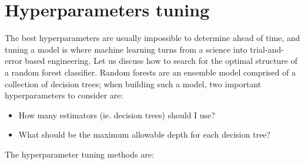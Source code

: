 \documentclass{book}
\begin{document}
\section{Hyperparameters tuning}
The best hyperparameters are usually impossible to determine ahead of time, and tuning a model is where machine learning turns from a science into trial-and-error based engineering.
Let us discuss how to search for the optimal structure of a random forest classifier. Random forests are an ensemble model comprised of a collection of decision trees; when building such a model, two important hyperparameters to consider are:
\begin{itemize}
\item How many estimators (ie. decision trees) should I use?
\item What should be the maximum allowable depth for each decision tree?
\end{itemize}
The hyperparameter tuning methods are:    
\end{document}
